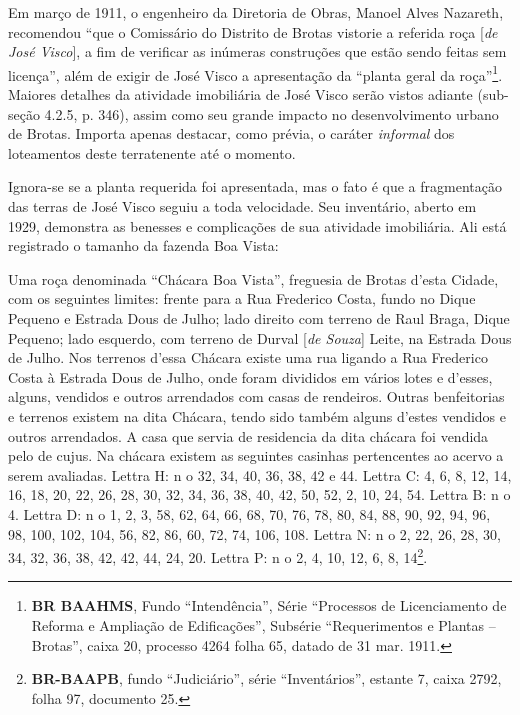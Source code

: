 Em março de 1911, o engenheiro da Diretoria de Obras, Manoel Alves Nazareth, recomendou ``que o Comissário do Distrito de Brotas vistorie a referida roça [\textit{de José Visco}], a fim de verificar as inúmeras construções que estão sendo feitas sem licença'', além de exigir de José Visco a apresentação da ``planta geral da roça''\footnote{\textbf{BR BAAHMS}, Fundo ``Intendência'', Série ``Processos de Licenciamento de Reforma e Ampliação de Edificações'', Subsérie ``Requerimentos e Plantas – Brotas'', caixa 20, processo 4264 folha 65, datado de 31 mar. 1911.}. Maiores detalhes da atividade imobiliária de José Visco serão vistos adiante (sub-seção 4.2.5, p. 346), assim como seu grande impacto no desenvolvimento urbano de Brotas. Importa apenas destacar, como prévia, o caráter \textit{informal} dos loteamentos deste terratenente até o momento. 

Ignora-se se a planta requerida foi apresentada, mas o fato é que a fragmentação das terras de José Visco seguiu a toda velocidade. Seu inventário, aberto em 1929, demonstra as benesses e complicações de sua atividade imobiliária. Ali está registrado o tamanho da fazenda Boa Vista:

\begin{citacao}
Uma roça denominada ``Chácara Boa Vista'', freguesia de Brotas d’esta Cidade, com os seguintes limites: frente para a Rua Frederico Costa, fundo no Dique Pequeno e Estrada Dous de Julho; lado direito com terreno de Raul Braga, Dique Pequeno; lado esquerdo, com terreno de Durval [\textit{de Souza}] Leite, na Estrada Dous de Julho. Nos terrenos d’essa Chácara existe uma rua ligando a Rua Frederico Costa à Estrada Dous de Julho, onde foram divididos em vários lotes e d’esses, alguns, vendidos e outros arrendados com casas de rendeiros. Outras benfeitorias e terrenos existem na dita Chácara, tendo sido também alguns d’estes vendidos e outros arrendados. A casa que servia de residencia da dita chácara foi vendida pelo de cujus. Na chácara existem as seguintes casinhas pertencentes ao acervo a serem avaliadas. Lettra H: n o 32, 34, 40, 36, 38, 42 e 44. Lettra C: 4, 6, 8, 12, 14, 16, 18, 20, 22, 26, 28, 30, 32, 34, 36, 38, 40, 42, 50, 52, 2, 10, 24, 54. Lettra B: n o 4. Lettra D: n o 1, 2, 3, 58, 62, 64, 66, 68, 70, 76, 78, 80, 84, 88, 90, 92, 94, 96, 98, 100, 102, 104, 56, 82, 86, 60, 72, 74, 106, 108. Lettra N: n o 2, 22, 26, 28, 30, 34, 32, 36, 38, 42, 42, 44, 24, 20. Lettra P: n o 2, 4, 10, 12, 6, 8, 14\footnote{\textbf{BR-BAAPB}, fundo ``Judiciário'', série ``Inventários'', estante 7, caixa 2792, folha 97, documento 25.}.
\end{citacao}

